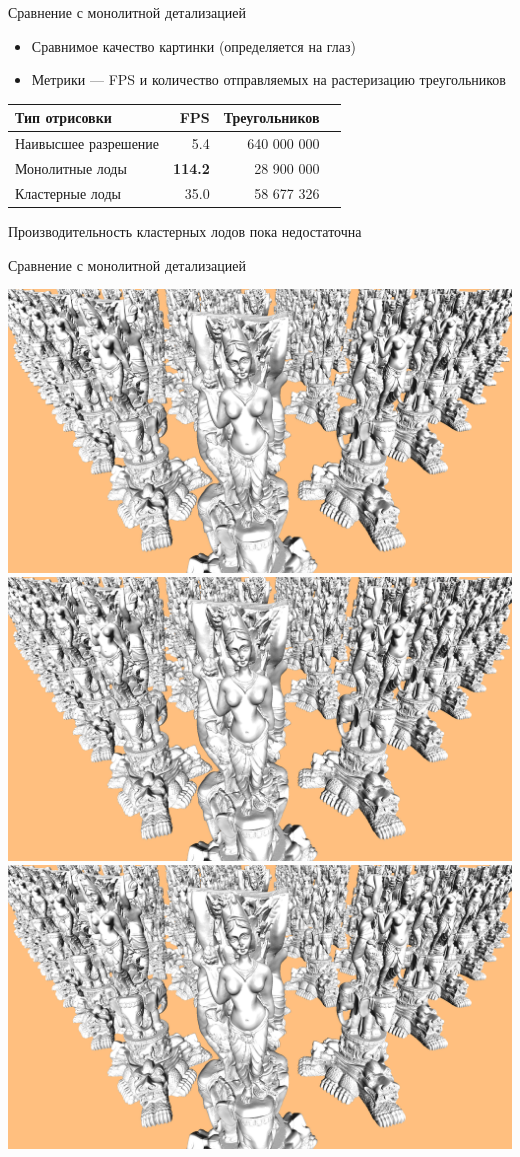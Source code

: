 \begin{frame}{Сравнение с монолитной детализацией}
    \begin{itemize}
        \item Сравнимое качество картинки (определяется на глаз)
        \item Метрики --- FPS и количество отправляемых на растеризацию треугольников
    \end{itemize}

    \begin{center}
        \begin{tabular}{lrrr}
            \hline \hline
            Тип отрисовки & FPS & Треугольников \\ \hline
            Наивысшее разрешение & 5.4 & 640 000 000 \\
            Монолитные лоды & \textbf{114.2} & 28 900 000 \\
            Кластерные лоды & 35.0 & 58 677 326 \\
            \hline \hline
        \end{tabular}
    \end{center}

    \alert{Производительность кластерных лодов пока недостаточна}
\end{frame}

\begin{frame}{Сравнение с монолитной детализацией}
    \begin{center}
        \includegraphics[width=.45\textwidth]{../Text/pics/comparison-mono.png}
        \includegraphics[width=.45\textwidth]{../Text/pics/comparison-cluster.png}
        \includegraphics[width=.45\textwidth]{../Text/pics/comparison-0.png}
    \end{center}
\end{frame}
